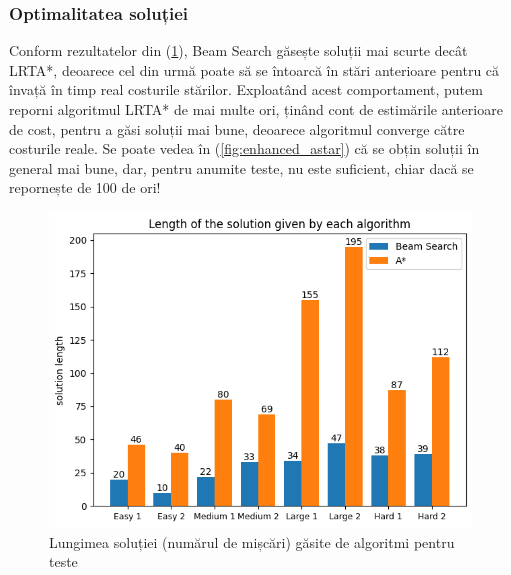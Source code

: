\documentclass{article}
\begin{document}
\subsubsection*{Optimalitatea soluției}
Conform rezultatelor din (\ref{fig:solution_length}), Beam Search găsește 
soluții mai scurte decât LRTA*, deoarece cel din urmă poate să se întoarcă în 
stări anterioare pentru că învață în timp real costurile stărilor. Exploatând 
acest comportament, putem reporni algoritmul LRTA* de mai multe ori, ținând cont
de estimările anterioare de cost, pentru a găsi soluții mai bune, deoarece
algoritmul converge către costurile reale. Se poate vedea în 
(\ref{fig:enhanced_astar}) că se obțin soluții în general mai bune, dar, pentru
anumite teste, nu este suficient, chiar dacă se repornește de 100 de ori!

\begin{figure}
    \includegraphics[scale=0.8]{solution/solution_length.png}
    \caption{Lungimea soluției (numărul de mișcări) găsite de algoritmi pentru 
    teste}
    \label{fig:solution_length}
\end{figure}
\end{document}

